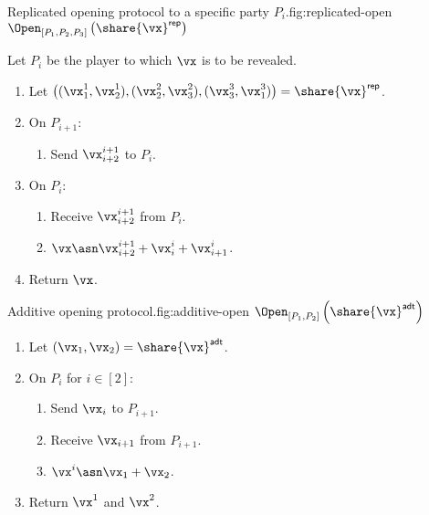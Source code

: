 \begin{Boxfig}{Replicated opening protocol to a specific party $P_i$.}{fig:replicated-open}
  {$\Open_{[P_1, P_2, P_3]} \left( \share{\vx}^{\mathsf{rep}} \right)$}

  Let $P_i$ be the player to which $\vx$ is to be revealed.

  \begin{enumerate}
  \item Let $\left( (\vx_1^1, \vx_2^1), (\vx_2^2, \vx_3^2), (\vx_3^3, \vx_1^3) \right) = \share{\vx}^{\mathsf{rep}}$.
  \item On $P_{i+1}$:
  \begin{enumerate}
    \item Send $\vx_{i+2}^{i+1}$ to $P_{i}$.
  \end{enumerate}
  \item On $P_i$:
  \begin{enumerate}
   \item Receive $\vx_{i+2}^{i+1}$ from $P_{i}$.
   \item $\vx \asn \vx_{i+2}^{i+1} + \vx_i^i + \vx_{i+1}^{i}$.
  \end{enumerate}
  \item Return $\vx$.
\end{enumerate}
\end{Boxfig}


\begin{Boxfig}{Additive opening protocol.}{fig:additive-open}
  {$\Open_{[P_1, P_2]} \left( \share{\vx}^{\mathsf{adt}} \right)$}
  \begin{enumerate}
  \item Let $(\vx_1, \vx_2) = \share{\vx}^{\mathsf{adt}}$.
  \item On $P_i$ for $i \in [2]$:
  \begin{enumerate}
    \item Send $\vx_i$ to $P_{i+1}$.
    \item Receive $\vx_{i+1}$ from $P_{i+1}$.
    \item $\vx^i \asn \vx_1 + \vx_2$.
  \end{enumerate}
  \item Return $\vx^1$ and $\vx^2$.
\end{enumerate}
\end{Boxfig}
